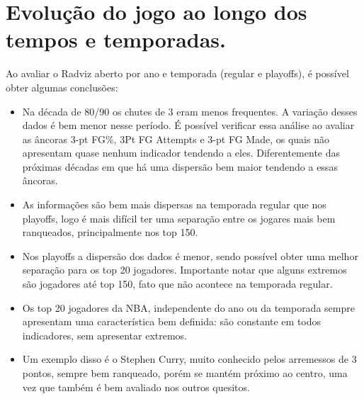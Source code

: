 \documentclass[
]{book}
\providecommand{\tightlist}{%
  \setlength{\itemsep}{0pt}\setlength{\parskip}{0pt}}
\begin{document}
\hypertarget{evoluuxe7uxe3o-do-jogo-ao-longo-dos-tempos-e-temporadas.}{%
\chapter{Evolução do jogo ao longo dos tempos e temporadas.}\label{evoluuxe7uxe3o-do-jogo-ao-longo-dos-tempos-e-temporadas.}}

Ao avaliar o Radviz aberto por ano e temporada (regular e playoffs), é possível obter algumas conclusões:

\begin{itemize}
\tightlist
\item
  Na década de 80/90 os chutes de 3 eram menos frequentes. A variação desses dados é bem menor nesse período. É possível verificar essa análise ao avaliar as âncoras 3-pt FG\%, 3Pt FG Attempts e 3-pt FG Made, os quais não apresentam quase nenhum indicador tendendo a eles. Diferentemente das próximas décadas em que há uma dispersão bem maior tendendo a essas âncoras.
\item
  As informações são bem mais dispersas na temporada regular que nos playoffs, logo é mais difícil ter uma separação entre os jogares mais bem ranqueados, principalmente nos top 150.
\item
  Nos playoffs a dispersão dos dados é menor, sendo possível obter uma melhor separação para os top 20 jogadores. Importante notar que alguns extremos são jogadores até top 150, fato que não acontece na temporada regular.
\item
  Os top 20 jogadores da NBA, independente do ano ou da temporada sempre apresentam uma característica bem definida: são constante em todos indicadores, sem apresentar extremos.
\item
  Um exemplo disso é o Stephen Curry, muito conhecido pelos arremessos de 3 pontos, sempre bem ranqueado, porém se mantém próximo ao centro, uma vez que também é bem avaliado nos outros quesitos.
\end{itemize}
\end{document}
